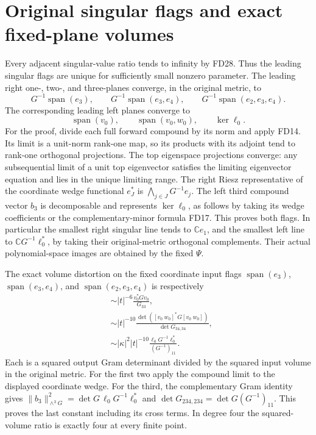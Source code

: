 \documentclass[11pt]{article}
\newcommand{\C}{\mathbb C}
\newcommand{\Span}{\operatorname{span}}
\begin{document}
\section{Original singular flags and exact fixed-plane volumes}
Every adjacent singular-value ratio tends to infinity
by FD28. Thus the leading singular flags are unique for
sufficiently small nonzero parameter. The leading right
one-, two-, and three-planes converge, in the original
metric, to
\[
 G^{-1}\Span(e_3),\qquad
 G^{-1}\Span(e_3,e_4),\qquad
 G^{-1}\Span(e_2,e_3,e_4).
 \tag{FD29}
\]
The corresponding leading left planes converge to
\[
 \Span(v_0),\qquad \Span(v_0,w_0),\qquad \ker\ell_0.
 \tag{FD30}
\]
For the proof, divide each full forward compound by its
norm and apply FD14. Its limit is a unit-norm rank-one
map, so its products with its adjoint tend to rank-one
orthogonal projections. The top eigenspace projections
converge: any subsequential limit of a unit top eigenvector
satisfies the limiting eigenvector equation and lies in
the unique limiting range. The right Riesz representative
of the coordinate wedge functional \(e_J^*\) is
\(\bigwedge_{j\in J}G^{-1}e_j\). The left third compound
vector \(b_3\) is decomposable and represents \(\ker\ell_0\),
as follows by taking its wedge coefficients or the
complementary-minor formula FD17. This proves both flags.
In particular the smallest right singular line tends to
\(\C e_1\), and the smallest left line to
\(\C G^{-1}\ell_0^*\), by taking their original-metric
orthogonal complements. Their actual polynomial-space
images are obtained by the fixed \(\Psi\).

The exact volume distortion on the fixed coordinate
input flags \(\Span(e_3)\), \(\Span(e_3,e_4)\), and
\(\Span(e_2,e_3,e_4)\) is respectively
\[
\begin{aligned}
 &\sim |t|^{-6}\frac{v_0^*Gv_0}{G_{33}},\\
 &\sim |t|^{-10}
              \frac{\det([v_0\ w_0]^*G[v_0\ w_0])}{\det G_{34,34}},\\
 &\sim |\kappa|^2|t|^{-10}
              \frac{\ell_0G^{-1}\ell_0^*}{(G^{-1})_{11}}.
\end{aligned}\tag{FD31}
\]
Each is a squared output Gram determinant divided by
the squared input volume in the original metric. For
the first two apply the compound limit to the displayed
coordinate wedge. For the third, the complementary
Gram identity gives
\(\|b_3\|_{\wedge^3G}^2
=\det G\,\ell_0G^{-1}\ell_0^*\) and
\(\det G_{234,234}=\det G(G^{-1})_{11}\).
This proves the last constant including its cross terms.
In degree four the squared-volume ratio is exactly four
at every finite point.
\end{document}
